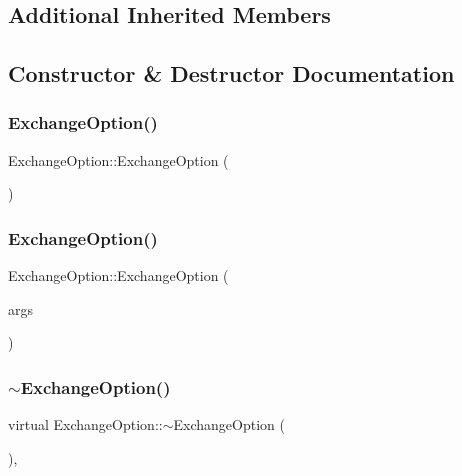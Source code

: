 \subsection*{Additional Inherited Members}


\subsection{Constructor \& Destructor Documentation}
\hypertarget{classExchangeOption_a191e8afcc8384e43506d3c13e8dac6c5}{}\label{classExchangeOption_a191e8afcc8384e43506d3c13e8dac6c5} 
\subsubsection{\texorpdfstring{Exchange\+Option()}{ExchangeOption()}\hspace{0.1cm}{\footnotesize\ttfamily [1/2]}}
{\footnotesize\ttfamily Exchange\+Option\+::\+Exchange\+Option (\begin{DoxyParamCaption}{ }\end{DoxyParamCaption})}

\hypertarget{classExchangeOption_a642fa4a55bab2deb15a4069824fcd581}{}\label{classExchangeOption_a642fa4a55bab2deb15a4069824fcd581} 
\subsubsection{\texorpdfstring{Exchange\+Option()}{ExchangeOption()}\hspace{0.1cm}{\footnotesize\ttfamily [2/2]}}
{\footnotesize\ttfamily Exchange\+Option\+::\+Exchange\+Option (\begin{DoxyParamCaption}\item[{const \hyperlink{classMJArray}{M\+J\+Array} \&}]{args }\end{DoxyParamCaption})}

\hypertarget{classExchangeOption_a4a68daa19012f51f02e3eba95373118c}{}\label{classExchangeOption_a4a68daa19012f51f02e3eba95373118c} 
\subsubsection{\texorpdfstring{$\sim$\+Exchange\+Option()}{~ExchangeOption()}}
{\footnotesize\ttfamily virtual Exchange\+Option\+::$\sim$\+Exchange\+Option (\begin{DoxyParamCaption}{ }\end{DoxyParamCaption})\hspace{0.3cm}{\ttfamily [inline]}, {\ttfamily [virtual]}}




